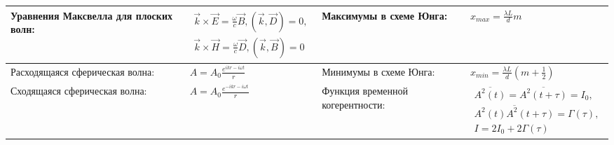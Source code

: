 \documentclass{article}
\begin{document}
\begin{tabular}{ |p{4.1cm}|p{5.4cm}|p{3.9cm}|p{5.6cm}|  }
\hline
Уравнения Максвелла для плоских волн:                                        &  %
$\begin{aligned}
\vec{k} \times \vec{E} = \frac{\omega}{c} \vec{B}, (\vec{k}, \vec{D}) = 0, \\
\vec{k} \times \vec{H} = \frac{\omega}{c} \vec{D}, (\vec{k}, \vec{B}) = 0
\end{aligned}$                                                               &  %
Максимумы в схеме Юнга:                                                      &  %
$x_{max} = \frac{\lambda L}{d} m$                                            \\ %
\hline
Расходящаяся сферическая волна:                                              &  %
$A = A_0 \frac{e^{i k r-i \omega t}}{r}$                                     &  %
Минимумы в схеме Юнга:                                                       &  %
$x_{min} = \frac{\lambda L}{d} (m + \frac{1}{2})$                                                                             \\ %
\hline
Сходящаяся сферическая волна:                                                &  %
$A = A_0 \frac{e^{-i k r-i \omega t}}{r}$                                    &  %
Функция временной когерентности:                                             &  %
$\begin{aligned}
\overline{A^2(t)} = \overline{A^2(t+\tau)} = I_0, \\
\overline{A^2(t) A^2(t+\tau)} = \Gamma(\tau),     \\
I = 2 I_0 + 2 \Gamma(\tau)
\end{aligned}$                                                               \\ %
\hline
\end{tabular}

\newpage
\end{document}
